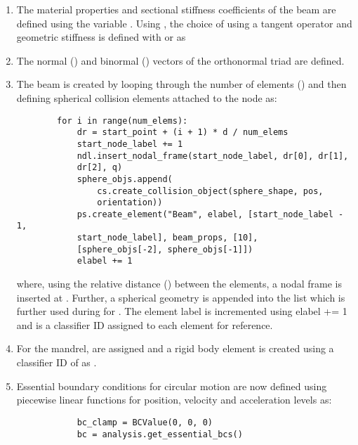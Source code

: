 \begin{enumerate}
    \item The material properties and sectional stiffness coefficients of the beam are defined using the variable . Using , the choice of using a tangent operator and geometric stiffness is defined with  or  as 
    \item The normal () and binormal () vectors of the orthonormal triad are defined.
    \item The beam is created by looping through the number of elements () and then defining spherical collision elements attached to the node as:
    \pythonstyle
    \begin{lstlisting}
        for i in range(num_elems):
            dr = start_point + (i + 1) * d / num_elems
            start_node_label += 1
            ndl.insert_nodal_frame(start_node_label, dr[0], dr[1], 
            dr[2], q)
            sphere_objs.append(
                cs.create_collision_object(sphere_shape, pos, 
                orientation))
            ps.create_element("Beam", elabel, [start_node_label - 1,
            start_node_label], beam_props, [10], 
            [sphere_objs[-2], sphere_objs[-1]])
            elabel += 1
    \end{lstlisting}    
   where, using the relative distance () between the elements, a nodal frame is inserted at . Further, a spherical geometry is appended into the list  which is further used during  for . The element label  is incremented using elabel += 1 and \pythoninline{[10]} is a classifier ID assigned to each element for reference.
    \item For the mandrel,  are assigned and a rigid body element is created using a classifier ID of \pythoninline{[298]} as . 
    \item Essential boundary conditions for circular motion are now defined using piecewise linear functions  for position, velocity and acceleration levels as:
        \pythonstyle
        \begin{lstlisting}
            bc_clamp = BCValue(0, 0, 0)
            bc = analysis.get_essential_bcs()

\end{lstlisting}
\end{enumerate}
